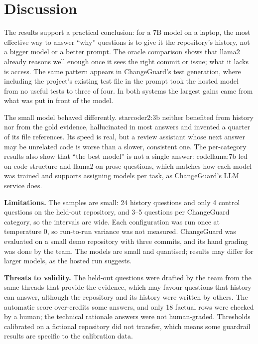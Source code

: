 \documentclass[12pt,onecolumn,draftclsnofoot]{IEEEtran}
\begin{document}
\section{Discussion}

The results support a practical conclusion: for a 7B model on a laptop, the most effective way to answer ``why'' questions is to give it the repository's history, not a bigger model or a better prompt. The oracle comparison shows that llama2 already reasons well enough once it sees the right commit or issue; what it lacks is access. The same pattern appears in ChangeGuard's test generation, where including the project's existing test file in the prompt took the hosted model from no useful tests to three of four. In both systems the largest gains came from what was put in front of the model.

The small model behaved differently. starcoder2:3b neither benefited from history nor from the gold evidence, hallucinated in most answers and invented a quarter of its file references. Its speed is real, but a review assistant whose next answer may be unrelated code is worse than a slower, consistent one. The per-category results also show that ``the best model'' is not a single answer: codellama:7b led on code structure and llama2 on prose questions, which matches how each model was trained and supports assigning models per task, as ChangeGuard's LLM service does.

\textbf{Limitations.} The samples are small: 24 history questions and only 4 control questions on the held-out repository, and 3--5 questions per ChangeGuard category, so the intervals are wide. Each configuration was run once at temperature 0, so run-to-run variance was not measured. ChangeGuard was evaluated on a small demo repository with three commits, and its hand grading was done by the team. The models are small and quantised; results may differ for larger models, as the hosted run suggests.

\textbf{Threats to validity.} The held-out questions were drafted by the team from the same threads that provide the evidence, which may favour questions that history can answer, although the repository and its history were written by others. The automatic score over-credits some answers, and only 18 factual rows were checked by a human; the technical rationale answers were not human-graded. Thresholds calibrated on a fictional repository did not transfer, which means some guardrail results are specific to the calibration data.
\end{document}
